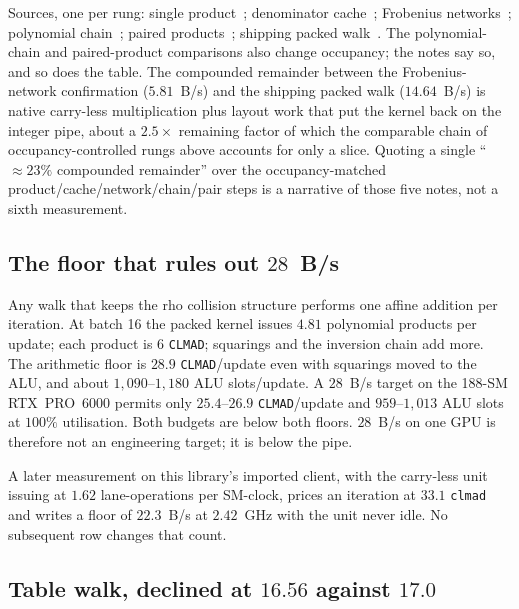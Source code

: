 Sources, one per rung: single product~;
denominator cache~;
Frobenius networks~;
polynomial chain~;
paired products~;
shipping packed walk~.
The polynomial-chain and paired-product comparisons also change
occupancy; the notes say so, and so does the table. The compounded
remainder between the Frobenius-network confirmation ($5.81$~B/s)
and the shipping packed walk ($14.64$~B/s) is native carry-less
multiplication plus layout work that put the kernel back on the
integer pipe, about a $2.5\times$ remaining factor of which the
comparable chain of occupancy-controlled rungs above accounts for
only a slice. Quoting a single ``$\approx 23\%$ compounded remainder''
over the occupancy-matched product/cache/network/chain/pair steps is
a narrative of those five notes, not a sixth measurement.

\subsection{The floor that rules out $28$~B/s}
\label{sec:floor28}

Any walk that keeps the rho collision structure performs one affine
addition per iteration. At batch 16 the packed kernel issues $4.81$
polynomial products per update; each product is $6$ \texttt{CLMAD};
squarings and the inversion chain add more. The arithmetic floor is
$28.9$ \texttt{CLMAD}/update even with squarings moved to the ALU, and
about $1{,}090$--$1{,}180$ ALU slots/update. A $28$~B/s target on the
188-SM RTX~PRO~6000 permits only $25.4$--$26.9$ \texttt{CLMAD}/update
and $959$--$1{,}013$ ALU slots at $100\%$ utilisation. Both budgets
are below both floors. $28$~B/s on one GPU is therefore not an
engineering target; it is below the pipe.

A later measurement on this library's imported client, with the
carry-less unit issuing at $1.62$ lane-operations per SM-clock, prices
an iteration at $33.1$ \texttt{clmad} and writes a floor of
$22.3$~B/s at $2.42$~GHz with the unit never idle. No subsequent row
changes that count.

\subsection{Table walk, declined at $16.56$ against $17.0$}
\label{sec:tablewalk}

